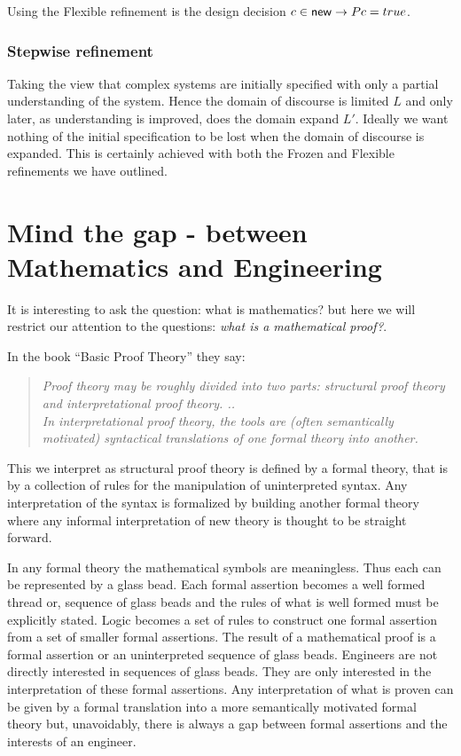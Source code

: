 Using the Flexible  refinement  is the  design decision $c\in {\sf new} \rightarrow P c = true$.

\subsubsection{Stepwise refinement}
Taking the view that complex systems are initially specified with only a partial understanding of the system. Hence the domain of discourse is limited $L$  and only later, as  understanding is improved, does the domain expand $L'$. Ideally we want nothing of the initial specification to be lost when the domain of discourse is expanded. This is certainly  achieved with both the Frozen and Flexible refinements we have outlined.





\section{Mind the gap - between Mathematics and Engineering} \label{sec:M2E}

It is interesting to ask the question: what is mathematics? but here we will restrict our attention to the questions: \emph{what is a mathematical proof?}.

In \cite{BPT00} the book ``Basic Proof Theory'' they say:
\begin{quotation}
\emph{Proof theory may be roughly divided into two parts: structural proof theory and interpretational proof theory. .. \\
In interpretational proof theory, the tools are (often semantically motivated) syntactical translations of one formal theory into another. }
\end{quotation}

This we interpret as structural proof theory is defined by a formal theory, that is by a collection of rules for the manipulation of uninterpreted syntax. Any interpretation of the syntax is formalized by building another formal theory  where any informal interpretation of  new theory is thought to be straight forward.

In any formal theory the mathematical symbols are meaningless. Thus each can be represented by a glass bead. Each formal assertion becomes a well formed thread or,  sequence of glass beads and the rules of what is well formed must be explicitly stated.  Logic becomes a set of rules to construct  one  formal assertion from a set of smaller formal assertions. The result of a mathematical proof is a formal assertion or an uninterpreted  sequence of glass beads. Engineers are not directly interested in  sequences of glass beads. They are only interested in the interpretation of these formal assertions.  Any interpretation of  what is proven can be given by a formal translation into a more semantically motivated formal theory but, unavoidably, there is always a gap between formal assertions and the interests of an engineer.

